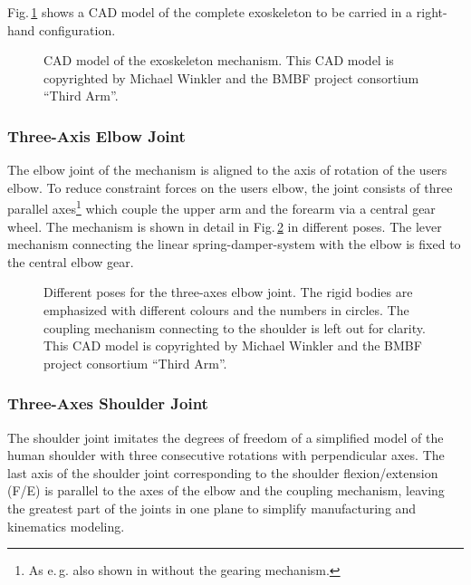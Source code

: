 \documentclass[letterpaper, 10 pt, conference]{ieeeconf}  %
\begin{document}
Fig.\,\ref{fig:KAS5_CAD} shows a CAD model of the complete exoskeleton to be carried in a right-hand configuration.


\begin{figure}[tb!]
    
    \caption{CAD model of the exoskeleton mechanism. This CAD model is copyrighted by Michael Winkler and the BMBF project consortium ``Third Arm''.}
    \label{fig:KAS5_CAD}
\end{figure} 

\subsubsection{Three-Axis Elbow Joint}

The elbow joint of the mechanism is aligned to the axis of rotation of the users elbow.
To reduce constraint forces on the users elbow, the joint consists of three parallel axes\footnote{As e.\,g. also shown in \cite{Pons2008} without the gearing mechanism.} which couple the upper arm and the forearm via a central gear wheel. The mechanism is shown in detail in Fig.\,\ref{fig:EllenbogenSimMech} in different poses.
The lever mechanism connecting the linear spring-damper-system with the elbow is fixed to the central elbow gear.

\begin{figure}[tb!]
    \small
    
    \caption{Different poses for the three-axes elbow joint. The rigid bodies are emphasized with different colours and the numbers in circles. The coupling mechanism connecting to the shoulder is left out for clarity. This CAD model is copyrighted by Michael Winkler and the BMBF project consortium ``Third Arm''.}
    \label{fig:EllenbogenSimMech}
\end{figure} 

\subsubsection{Three-Axes Shoulder Joint}

The shoulder joint imitates the degrees of freedom of a simplified model of the human shoulder with three consecutive rotations with perpendicular axes.
The last axis of the shoulder joint corresponding to the shoulder flexion/extension (F/E) is parallel to the axes of the elbow and the coupling mechanism, leaving the greatest part of the joints in one plane to simplify manufacturing and kinematics modeling.
\end{document}
